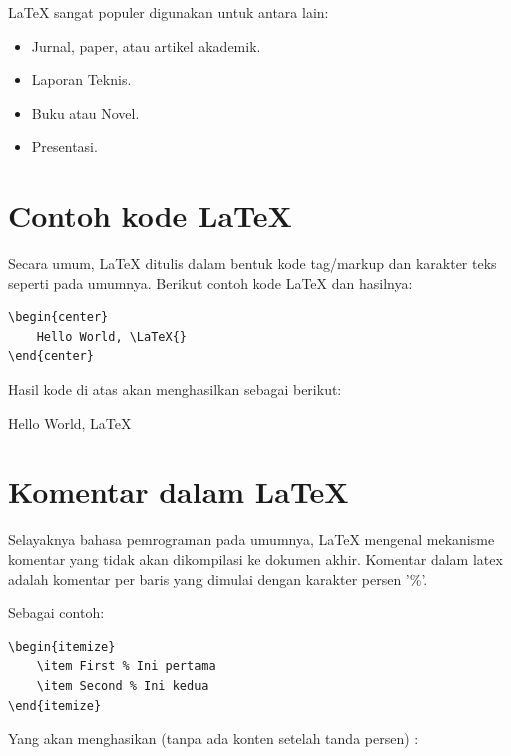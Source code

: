 \documentclass{book} %
\begin{document}
    \LaTeX{} sangat populer digunakan untuk antara lain:
    \begin{itemize}
        \item Jurnal, paper, atau artikel akademik.
        \item Laporan Teknis.
        \item Buku atau Novel.
        \item Presentasi.
    \end{itemize}

    \section{Contoh kode \LaTeX{}}

    Secara umum, \LaTeX{} ditulis dalam bentuk kode tag/markup dan karakter teks seperti pada umumnya.
    Berikut contoh kode \LaTeX{} dan hasilnya:

    \begin{verbatim}
\begin{center}
    Hello World, \LaTeX{}
\end{center}
    \end{verbatim}

    Hasil kode di atas akan menghasilkan sebagai berikut:
    \begin{center}
        Hello World, \LaTeX{}
    \end{center}

    \section{Komentar dalam LaTeX}

    Selayaknya bahasa pemrograman pada umumnya, LaTeX mengenal mekanisme komentar yang tidak akan dikompilasi ke dokumen akhir.
    Komentar dalam latex adalah komentar per baris yang dimulai dengan karakter persen '\%'.

    Sebagai contoh:

    \begin{verbatim}
\begin{itemize}
    \item First % Ini pertama
    \item Second % Ini kedua
\end{itemize}
    \end{verbatim}

    Yang akan menghasikan (tanpa ada konten setelah tanda persen) :
\end{document}
